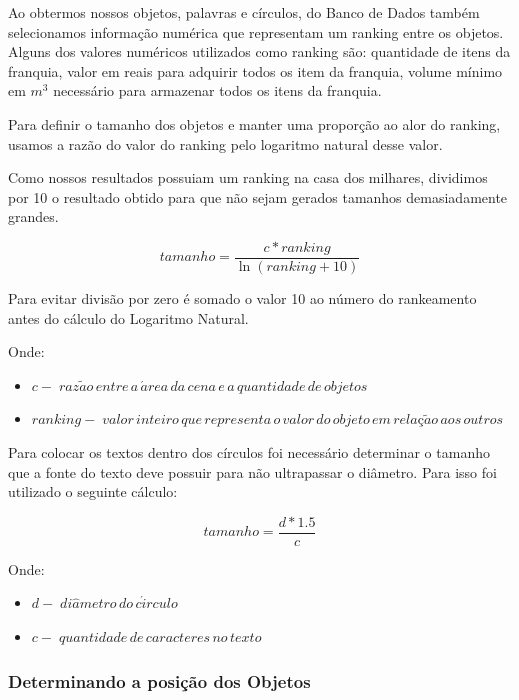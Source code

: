 \documentclass[12pt]{article}
\begin{document}
Ao obtermos nossos objetos, palavras e círculos, do Banco de Dados também selecionamos informação numérica que representam um ranking entre os objetos. Alguns dos valores numéricos utilizados como ranking são: quantidade de itens da franquia, valor em reais para adquirir todos os item da franquia, volume mínimo em $m^3$ necessário para armazenar todos os itens da franquia.

Para definir o tamanho dos objetos e manter uma proporção ao alor do ranking, usamos a razão do valor do ranking pelo logaritmo natural desse valor.

Como nossos resultados possuiam um ranking na casa dos milhares, dividimos por 10 o resultado obtido para que não sejam gerados tamanhos demasiadamente grandes. 

\begin{equation} 
tamanho = \frac{c * ranking}{\ln(ranking + 10)}
\end{equation}

Para evitar divisão por zero é somado o valor 10 ao número do rankeamento antes do cálculo do Logaritmo Natural.

Onde:

\begin{itemize}  
  \item $c -\; raz\tilde{a}o\,entre\,a\, \acute{a}rea\,da\,cena\,e\,a\,quantidade\,
  de\,objetos$
  \item $ranking -\; valor\,inteiro\,que\,representa\,o\,valor\,do\,objeto\,em\,relaç\tilde{a}o\,aos\,outros$
\end{itemize}

Para colocar os textos dentro dos círculos foi necessário determinar o tamanho que a fonte do texto deve possuir para não ultrapassar o diâmetro. Para isso foi utilizado o seguinte cálculo:

\begin{equation} 
tamanho = \frac{d * 1.5}{c}
\end{equation}

Onde:

\begin{itemize}  
  \item $d -\; di\hat{a}metro\,do\,c\acute{i}rculo$
  \item $c -\; quantidade\,de\,caracteres\,no\,texto$
\end{itemize}


\subsubsection{Determinando a posição dos Objetos}
\end{document}
